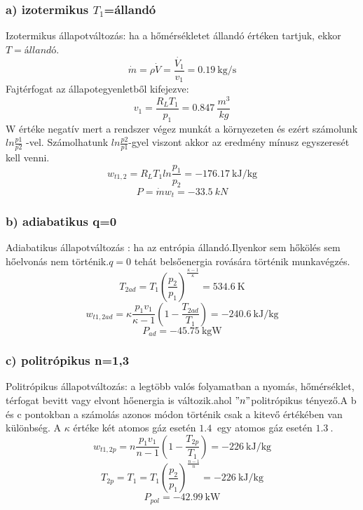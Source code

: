 \subsubsection{a) izotermikus $T_1$=állandó}
Izotermikus állapotváltozás: ha a hőmérsékletet állandó értéken tartjuk, ekkor $T=állandó$.
\begin{equation}
\dot{m}=\rho \dot{V}=\frac{\dot{V_1}}{v_1}=\SI{0,19}{\kilogram\per\second}
\end{equation}
Fajtérfogat az állapotegyenletből kifejezve:
\begin{equation}
v_1=\frac{R_L T_1}{p_1}=\SI{0,847}{\frac{m^3}{kg}}
\end{equation}
W értéke negatív mert a rendszer végez munkát a környezeten és ezért számolunk $ln\frac{p1}{p2}$ -vel. Számolhatunk $ln\frac{p2}{p1}$-gyel viszont akkor az eredmény mínusz egyszeresét kell venni.
\begin{equation}
w_{t1,2}=R_LT_1ln\frac{p_1}{p_2}=\SI{-176,17}{\kilo\joule\per\kilogram}
\end{equation}
\begin{equation}
P=\dot{m}w_t=\SI{-33,5}{kN}
\end{equation}

\subsubsection{b) adiabatikus q=0}
Adiabatikus állapotváltozás : ha az entrópia állandó.Ilyenkor sem hőkölés sem hőelvonás nem történik.$q=0$ tehát belsőenergia rovására történik munkavégzés.
\begin{equation}
T_{2ad}=T_1\left(\frac{p_2}{p_1}\right)^\frac{\kappa-1}{\kappa}=\SI{534,6}{\kelvin}
\end{equation}
\begin{equation}
w_{t1,2ad}=\kappa\frac{p_1v_1}{\kappa-1}\left(1-\frac{T_{2ad}}{T_1}\right)=\SI{-240,6}{\kilo\joule\per\kilogram}
\end{equation}
\begin{equation}
P_{ad}=\SI{-45,75}{\kilogram\watt}
\end{equation}

\subsubsection{c) politrópikus n=1,3}
Politrópikus állapotváltozás: a legtöbb valós folyamatban a nyomás, hőmérséklet, térfogat bevitt vagy elvont hőenergia is változik.ahol $"n"$politrópikus tényező.A b és c pontokban a számolás azonos módon történik csak a kitevő értékében van különbség.
A $\kappa$ értéke két atomos gáz esetén $\SI{1,4}{}$ egy atomos gáz esetén $\SI{1,3}{}$.
\begin{equation}
w_{t1,2p}=n\frac{p_1v_1}{n-1}\left(1-\frac{T_{2p}}{T_1}\right)=\SI{-226}{\kilo\joule\per\kilogram}
\end{equation}
\begin{equation}
T_{2p}=T_1=T_1\left(\frac{p_2}{p_1}\right)^\frac{n-1}{n}=\SI{-226}{\kilo\joule\per\kilogram}
\end{equation}
\begin{equation}
P_{pol}=\SI{-42,99}{\kilo\watt}
\end{equation}


